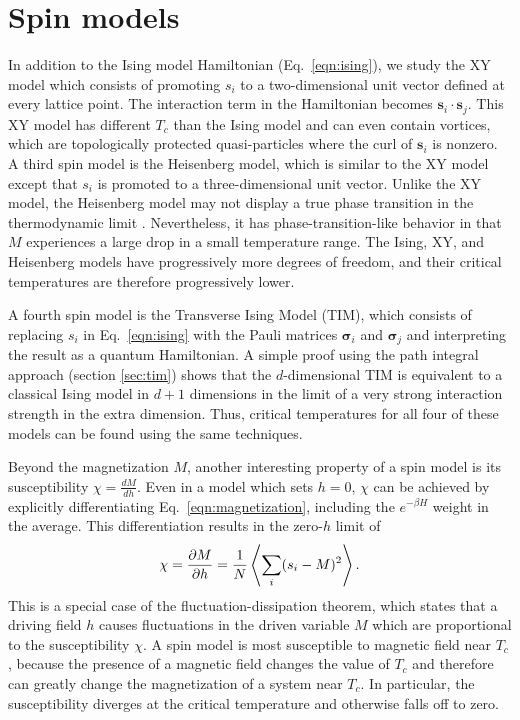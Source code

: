 \documentclass[
  amsmath,
  amssymb,
  aps,
  twocolumn,
  nofootinbib,
  floatfix,
]{revtex4-2}
\begin{document}
\section{Spin models}
\label{sec:spin-models}

In addition to the Ising model Hamiltonian (Eq.~\ref{eqn:ising}), we study the XY model which consists of promoting $s_i$ to a two-dimensional unit vector defined at every lattice point. The interaction term in the Hamiltonian becomes $\bm s_i \cdot \bm s_j$. This XY model has different $T_c$ than the Ising model and can even contain vortices, which are topologically protected quasi-particles where the curl of $\bm s_i$ is nonzero. A third spin model is the Heisenberg model, which is similar to the XY model except that $s_i$ is promoted to a three-dimensional unit vector. Unlike the XY model, the Heisenberg model may not display a true phase transition in the thermodynamic limit \cite{tomita2014finite}. Nevertheless, it has phase-transition-like behavior in that $M$ experiences a large drop in a small temperature range. The Ising, XY, and Heisenberg models have progressively more degrees of freedom, and their critical temperatures are therefore progressively lower.

A fourth spin model is the Transverse Ising Model (TIM), which consists of replacing $s_i$ in Eq.~\ref{eqn:ising} with the Pauli matrices $\bm \sigma_i$ and $\bm \sigma_j$ and interpreting the result as a quantum Hamiltonian. A simple proof using the path integral approach (section \ref{sec:tim}) shows that the $d$-dimensional TIM is equivalent to a classical Ising model in $d+1$ dimensions in the limit of a very strong interaction strength in the extra dimension. Thus, critical temperatures for all four of these models can be found using the same techniques.

Beyond the magnetization $M$, another interesting property of a spin model is its susceptibility $\chi = \frac{dM}{dh}$. Even in a model which sets $h=0$, $\chi$ can be achieved by explicitly differentiating Eq.~\ref{eqn:magnetization}, including the $e^{-\beta H}$ weight in the average. This differentiation results in the zero-$h$ limit of
\begin{equation}
  \chi = \frac{\partial M}{\partial h} = \frac{1}{N}\Braket{\sum_i(s_i - M)^2}.
\end{equation}
This is a special case of the fluctuation-dissipation theorem, which states that a driving field $h$ causes fluctuations in the driven variable $M$ which are proportional to the susceptibility $\chi$. A spin model is most susceptible to magnetic field near $T_c$, because the presence of a magnetic field changes the value of $T_c$ and therefore can greatly change the magnetization of a system near $T_c$. In particular, the susceptibility diverges at the critical temperature and otherwise falls off to zero.
\end{document}
